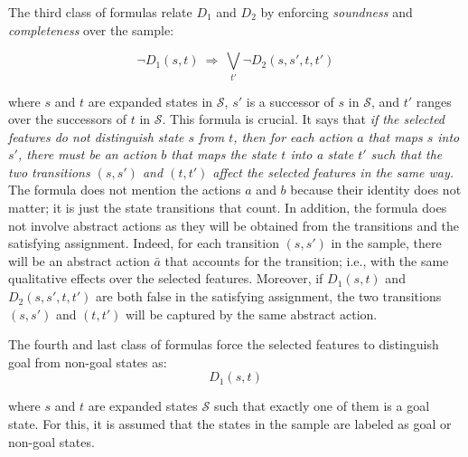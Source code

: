 \documentclass[letterpaper]{article} %
\newcommand{\Omit}[1]{}
\renewcommand{\S}{\mathcal{S}}
\begin{document}
The third class of formulas relate $D_1$ and $D_2$ by enforcing \emph{soundness}
and \emph{completeness} over  the sample: %
\Omit{
Since the abstract actions  are not given,
the qualitative changes in each  transition $(s,s')$ in $\S$
are  taken as templates  of abstract actions. Thus, if $s$ and $t$ are not distinguished by the selected features, 
for each transition $(s, s') \in \S$, there must be a transition $(t, t') \in \S$
such that the two transitions are not distinguished by the selected features either.
This is expressed as
}
%
\begin{equation}
  \label{eq:bridge1}
  \neg D_1(s, t) \  \Rightarrow\ \textstyle\bigvee_{t'} \neg D_2(s, s', t, t')
\end{equation}

\noindent where $s$ and $t$ are expanded states in  $\S$, $s'$ is a successor of $s$ in $\S$,
and $t'$ ranges over the successors of $t$ in $\S$. This formula is crucial. 
It says that \emph{if the selected features do not distinguish state $s$ from $t$,
then for each action $a$ that maps  $s$ into $s'$, there must be an action $b$ that maps the state
$t$ into a state $t'$ such that the two transitions $(s,s')$ and $(t,t')$ affect the selected features
in the same way.} The formula does not mention the actions $a$ and $b$ because their identity does not matter;
it is just the state transitions that count. In addition, the formula does not involve abstract actions as they
will be obtained from the transitions and  the satisfying assignment. Indeed, for each transition $(s,s')$ in the sample, there will be
an abstract action $\bar{a}$ that  accounts for the transition; i.e., with the  same qualitative effects over the selected features.
Moreover, if $D_1(s,t)$ and $D_2(s,s',t,t')$ are both false in the satisfying assignment, the two transitions $(s,s')$ and $(t,t')$
will be captured by the same abstract action.


The fourth and  last class of formulas force the selected features to distinguish goal from non-goal states as:
\begin{equation}
  \label{eq:goal}
  D_1(s,t) 
\end{equation}

\noindent where  $s$ and $t$  are expanded states  $\S$ such that exactly one of them is a goal state. 
For this, it is assumed that the states in the sample are labeled as goal or non-goal states.
\end{document}
